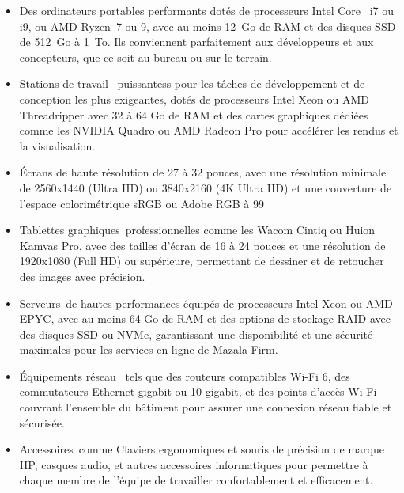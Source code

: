 \begin{itemize}
  \item Des ordinateurs portables performants dotés de processeurs Intel Core 
    i7 ou i9, ou AMD Ryzen 7 ou 9, avec au moins 12 Go de RAM et des disques
    SSD de 512 Go à 1 To. Ils conviennent parfaitement aux développeurs et aux
    concepteurs, que ce soit au bureau ou sur le terrain.

  \item Stations de travail  puissantess pour les tâches de développement et
    de conception les plus exigeantes, dotés de processeurs Intel Xeon ou AMD
    Threadripper avec 32 à 64 Go de RAM et des cartes graphiques dédiées comme
    les NVIDIA Quadro ou AMD Radeon Pro pour accélérer les rendus et la visualisation.

  \item Écrans de haute résolution de 27 à 32 pouces, avec une résolution
    minimale de 2560x1440 (Ultra HD) ou 3840x2160 (4K Ultra HD) et une couverture de
    l'espace colorimétrique sRGB ou Adobe RGB à 99%

  \item Tablettes graphiques professionnelles comme les Wacom Cintiq ou
    Huion Kamvas Pro, avec des tailles d'écran de 16 à 24 pouces et une
    résolution de 1920x1080 (Full HD) ou supérieure, permettant de dessiner et
    de retoucher des images avec précision.

  \item Serveurs de hautes performances équipés de processeurs Intel Xeon ou
    AMD EPYC, avec au moins 64 Go de RAM et des options de stockage RAID avec
    des disques SSD ou NVMe, garantissant une disponibilité et une sécurité
    maximales pour les services en ligne de Mazala-Firm.

  \item Équipements réseau  tels que des routeurs compatibles Wi-Fi 6, des
    commutateurs Ethernet gigabit ou 10 gigabit, et des points d'accès Wi-Fi
    couvrant l'ensemble du bâtiment pour assurer une connexion réseau fiable et
    sécurisée.

  \item Accessoires comme  Claviers ergonomiques et souris de précision de
    marque HP, casques audio, et autres accessoires informatiques pour
    permettre à chaque membre de l’équipe de travailler confortablement et
    efficacement.

\end{itemize}



